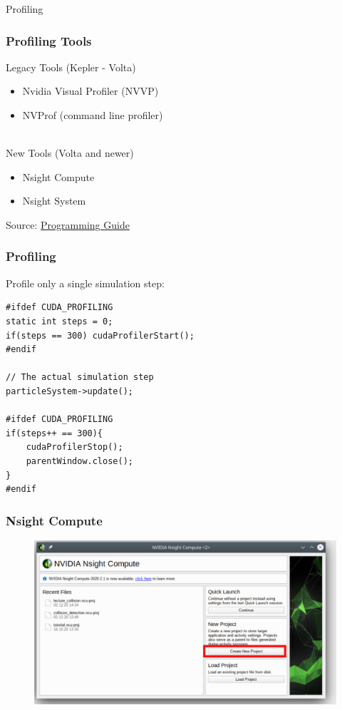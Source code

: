 \documentclass[aspectratio=169,handout]{beamer}
\begin{document}
\frame
{
\begin{center}
\Large Profiling
\end{center}
}


\begin{frame}[fragile]
\frametitle{Profiling Tools}
Legacy Tools (Kepler - Volta)
\begin{itemize}
	\item Nvidia Visual Profiler (NVVP)
	\item NVProf (command line profiler)
\end{itemize}
\hrulefill \\
New Tools (Volta and newer)
\begin{itemize}
	\item Nsight Compute
	\item Nsight System
\end{itemize}
\vspace{0.5cm}
Source: \href{https://docs.nvidia.com/cuda/profiler-users-guide/index.html#migrating-to-nsight-tools}{Programming Guide}
\end{frame}


\begin{frame}[fragile]
\frametitle{Profiling}
Profile only a single simulation step:

\begin{lstlisting}
#ifdef CUDA_PROFILING
static int steps = 0;
if(steps == 300) cudaProfilerStart();
#endif

// The actual simulation step
particleSystem->update();

#ifdef CUDA_PROFILING
if(steps++ == 300){
	cudaProfilerStop();
	parentWindow.close();
}
#endif

\end{lstlisting}
\end{frame}




\frame
{
	\frametitle{Nsight Compute}
		\begin{figure}
	\centering
	\includegraphics[height=0.95\textheight]{nsc1}
\end{figure}
}
\end{document}
